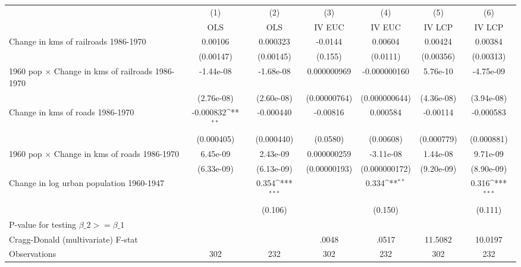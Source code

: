 {
\def\sym#1{\ifmmode^{#1}\else\(^{#1}\)\fi}
\begin{tabular}{l*{6}{c}}
\hline\hline
                &\multicolumn{1}{c}{(1)}&\multicolumn{1}{c}{(2)}&\multicolumn{1}{c}{(3)}&\multicolumn{1}{c}{(4)}&\multicolumn{1}{c}{(5)}&\multicolumn{1}{c}{(6)}\\
                &\multicolumn{1}{c}{OLS}&\multicolumn{1}{c}{OLS}&\multicolumn{1}{c}{IV EUC}&\multicolumn{1}{c}{IV EUC}&\multicolumn{1}{c}{IV LCP}&\multicolumn{1}{c}{IV LCP}\\
\hline
Change in kms of railroads 1986-1970&  0.00106         & 0.000323         &  -0.0144         &  0.00604         &  0.00424         &  0.00384         \\
                &(0.00147)         &(0.00145)         &  (0.155)         & (0.0111)         &(0.00356)         &(0.00313)         \\
[1em]
1960 pop $\times$ Change in kms of railroads 1986-1970&-1.44e-08         &-1.68e-08         &0.000000969         &-0.000000160         & 5.76e-10         &-4.75e-09         \\
                &(2.76e-08)         &(2.60e-08)         &(0.00000764)         &(0.000000644)         &(4.36e-08)         &(3.94e-08)         \\
[1em]
Change in kms of roads 1986-1970&-0.000832\sym{**} &-0.000440         & -0.00816         & 0.000584         & -0.00114         &-0.000583         \\
                &(0.000405)         &(0.000440)         & (0.0580)         &(0.00608)         &(0.000779)         &(0.000881)         \\
[1em]
1960 pop $\times$ Change in kms of roads 1986-1970& 6.45e-09         & 2.43e-09         &0.000000259         &-3.11e-08         & 1.44e-08         & 9.71e-09         \\
                &(6.33e-09)         &(6.13e-09)         &(0.00000193)         &(0.000000172)         &(9.20e-09)         &(8.90e-09)         \\
[1em]
Change in log urban population 1960-1947&                  &    0.354\sym{***}&                  &    0.334\sym{**} &                  &    0.316\sym{***}\\
                &                  &  (0.106)         &                  &  (0.150)         &                  &  (0.111)         \\
\hline
P-value for testing $\beta\_{2} >= \beta\_{1}$&                  &                  &                  &                  &                  &                  \\
Cragg-Donald (multivariate) F-stat&                  &                  &    .0048         &    .0517         &  11.5082         &  10.0197         \\
Observations    &      302         &      232         &      302         &      232         &      302         &      232         \\
\hline\hline
\end{tabular}
}

